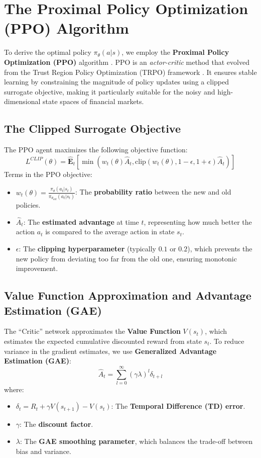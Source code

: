 \section{The Proximal Policy Optimization (PPO) Algorithm}
To derive the optimal policy $\pi_\theta(a|s)$, we employ the \textbf{Proximal Policy Optimization (PPO)} algorithm \citep{Schulman2017}. PPO is an \textit{actor-critic} method that evolved from the Trust Region Policy Optimization (TRPO) framework \citep{Schulman2015}. It ensures stable learning by constraining the magnitude of policy updates using a clipped surrogate objective, making it particularly suitable for the noisy and high-dimensional state spaces of financial markets.

\subsection{The Clipped Surrogate Objective}
The PPO agent maximizes the following objective function:
\begin{equation}
    L^{CLIP}(\theta) = \hat{\mathbf{E}}_t \left[ \min(w_t(\theta) \hat{A}_t, \text{clip}(w_t(\theta), 1-\epsilon, 1+\epsilon) \hat{A}_t) \right]
\end{equation}
Terms in the PPO objective:
\begin{itemize}
    \item $w_t(\theta) = \frac{\pi_\theta(a_t|s_t)}{\pi_{\theta_{old}}(a_t|s_t)}$: The \textbf{probability ratio} between the new and old policies.
    \item $\hat{A}_t$: The \textbf{estimated advantage} at time $t$, representing how much better the action $a_t$ is compared to the average action in state $s_t$.
    \item $\epsilon$: The \textbf{clipping hyperparameter} (typically $0.1$ or $0.2$), which prevents the new policy from deviating too far from the old one, ensuring monotonic improvement.
\end{itemize}

\subsection{Value Function Approximation and Advantage Estimation (GAE)}
The ``Critic'' network approximates the \textbf{Value Function} $V(s_t)$, which estimates the expected cumulative discounted reward from state $s_t$. To reduce variance in the gradient estimates, we use \textbf{Generalized Advantage Estimation (GAE)}:
\begin{equation}
    \hat{A}_t = \sum_{l=0}^{\infty} (\gamma \lambda)^l \delta_{t+l}
\end{equation}
where:
\begin{itemize}
    \item $\delta_t = R_t + \gamma V(s_{t+1}) - V(s_t)$: The \textbf{Temporal Difference (TD) error}.
    \item $\gamma$: The \textbf{discount factor}.
    \item $\lambda$: The \textbf{GAE smoothing parameter}, which balances the trade-off between bias and variance.
\end{itemize}

